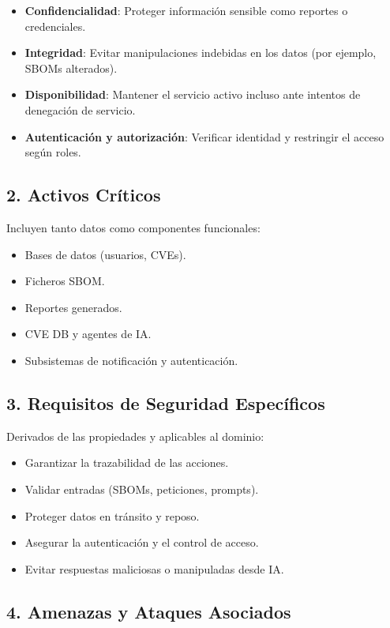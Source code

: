 \documentclass[11pt]{article}
\begin{document}
\begin{itemize}
    \item \textbf{Confidencialidad}: Proteger información sensible como reportes o credenciales.
    \item \textbf{Integridad}: Evitar manipulaciones indebidas en los datos (por ejemplo, SBOMs alterados).
    \item \textbf{Disponibilidad}: Mantener el servicio activo incluso ante intentos de denegación de servicio.
    \item \textbf{Autenticación y autorización}: Verificar identidad y restringir el acceso según roles.
\end{itemize}

\subsection*{2. Activos Críticos}

Incluyen tanto datos como componentes funcionales:

\begin{itemize}
    \item Bases de datos (usuarios, CVEs).
    \item Ficheros SBOM.
    \item Reportes generados.
    \item CVE DB y agentes de IA.
    \item Subsistemas de notificación y autenticación.
\end{itemize}

\subsection*{3. Requisitos de Seguridad Específicos}

Derivados de las propiedades y aplicables al dominio:

\begin{itemize}
    \item Garantizar la trazabilidad de las acciones.
    \item Validar entradas (SBOMs, peticiones, prompts).
    \item Proteger datos en tránsito y reposo.
    \item Asegurar la autenticación y el control de acceso.
    \item Evitar respuestas maliciosas o manipuladas desde IA.
\end{itemize}

\subsection*{4. Amenazas y Ataques Asociados}
\end{document}
